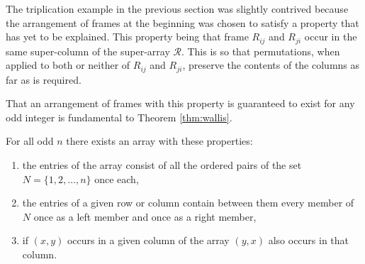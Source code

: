 The triplication example in the previous section was slightly contrived because the arrangement of frames at the beginning was chosen to satisfy a property that has yet to be explained.
This property being that frame $R_{ij}$ and $R_{ji}$ occur in the same super-column of the super-array $\mathcal{R}$.
This is so that permutations, when applied to both or neither of $R_{ij}$ and $R_{ji}$, preserve the contents of the columns as far as is required.

That an arrangement of frames with this property is guaranteed to exist for any odd integer is fundamental to Theorem \ref{thm:wallis}.

\begin{lemma}
For all odd $n$ there exists an array with these properties:
\begin{enumerate}
  \item{the entries of the array consist of all the ordered pairs of the set $N = \{1, 2, \ldots, n\}$ once each,}
  \item{the entries of a given row or column contain between them every member of $N$ once as a left member and once as a right member,}
  \item{if $(x,y)$ occurs in a given column of the array $(y,x)$ also occurs in that column.}
\end{enumerate}
\end{lemma}

